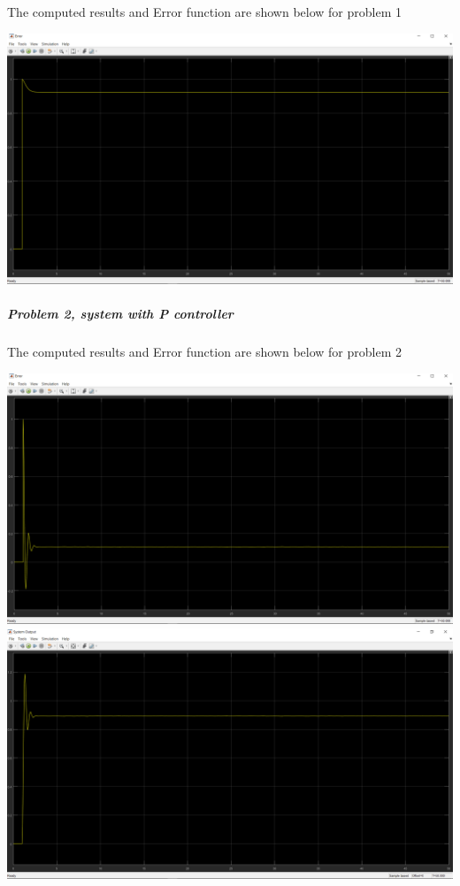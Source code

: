 \documentclass[12pt]{article}
\begin{document}
\begin{center}
The computed results and Error function are shown below for problem 1\\
\end{center}
  
\includegraphics[scale=0.4]{../Lab3,4/HW for lab 3,4/LAB4/Error_1_No_controller.png}\\
\cleardoublepage
\subparagraph{Problem 2, system with P controller}
\begin{center}
The computed results and Error function are shown below for problem 2\\
\end{center}

\includegraphics[scale=0.3]{../Lab3,4/HW for lab 3,4/LAB4/Error_2_P_controller.png} \\
\includegraphics[scale=0.3]{../Lab3,4/HW for lab 3,4/LAB4/OUTPUT_2_P_controller.png} \\
\end{document}
